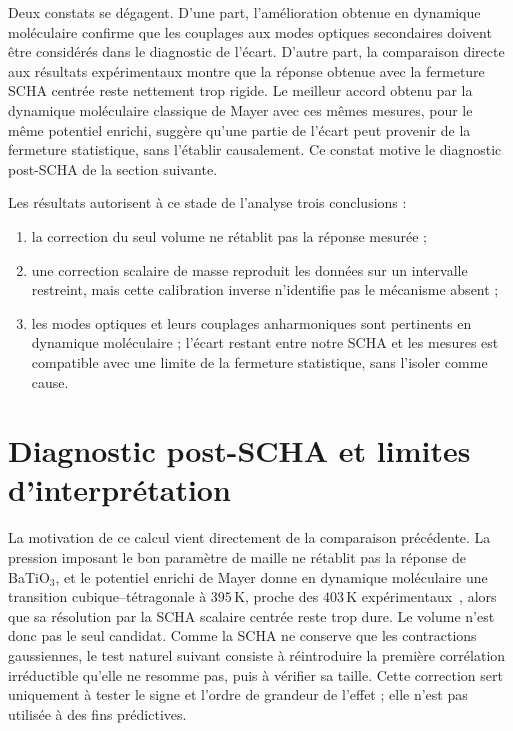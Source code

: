 Deux constats se dégagent. D'une part, l'amélioration obtenue
en dynamique moléculaire confirme que les couplages aux modes optiques
secondaires doivent être considérés dans le diagnostic de l'écart. D'autre
part, la comparaison directe aux résultats expérimentaux montre que la réponse
obtenue avec la fermeture SCHA centrée reste nettement trop rigide. Le meilleur
accord obtenu par la dynamique moléculaire classique de Mayer avec ces mêmes
mesures, pour le même potentiel enrichi, suggère qu'une partie de l'écart peut
provenir de la fermeture statistique, sans l'établir causalement. Ce constat
motive le diagnostic post-SCHA de la section suivante.

Les résultats autorisent à ce stade de l'analyse trois conclusions :
\begin{enumerate}
  \item la correction du seul volume ne rétablit pas la réponse mesurée ;
  \item une correction scalaire de masse reproduit les données sur un intervalle
  restreint, mais cette calibration inverse n'identifie pas le mécanisme absent ;
  \item les modes optiques et leurs couplages anharmoniques sont pertinents en
  dynamique moléculaire ; l'écart restant entre notre SCHA et les mesures est
  compatible avec une limite de la fermeture statistique, sans l'isoler comme
  cause.
\end{enumerate}

\section{Diagnostic post-SCHA et limites d'interprétation}
\label{ann:post_scha_fr}

La motivation de ce calcul vient directement de la comparaison précédente.
La pression imposant le bon paramètre de maille ne rétablit pas la réponse de
BaTiO$_3$, et le potentiel enrichi de Mayer donne en dynamique moléculaire une
transition cubique--tétragonale à $395\,\mathrm K$, proche des
$403\,\mathrm K$ expérimentaux~\cite{Mayer2022}, alors que sa résolution par la
SCHA scalaire centrée reste trop dure. Le volume n'est donc pas le seul
candidat. Comme la SCHA ne conserve que les contractions gaussiennes, le test
naturel suivant consiste à réintroduire la première corrélation irréductible
qu'elle ne resomme pas, puis à vérifier sa taille. Cette correction sert
uniquement à tester le signe et l'ordre de grandeur de l'effet ; elle n'est pas
utilisée à des fins prédictives.

